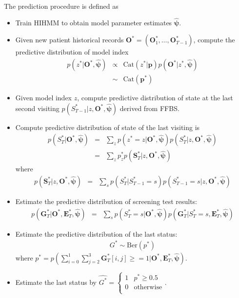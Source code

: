 \documentclass{article}
\begin{document}
The prediction procedure is defined as 
\begin{itemize}
	\item Train HIHMM to obtain model parameter estimates $\hat{\bm \psi}$.
	\item Given new patient historical records $\bm O^* = (\bm O^*_1, \ldots, \bm O^*_{T-1})$, compute the predictive distribution of model index
	\begin{eqnarray}
	p(z^*|\bm O^*, \hat{\bm \psi}) & \propto & \mathrm{Cat}(z^*|\bm p)p(\bm O^*|z^*, \hat{\bm \psi}) \nonumber \\
	& \sim & \mathrm{Cat}(\bm p^*)
	\end{eqnarray}
	\item Given model index $z$, compute predictive distribution of state at the last second visiting 
	$p(S^*_{T-1}|z, \bm O^*, \hat{\bm \psi})$ derived from FFBS.
	\item Compute predictive distribution of state of the last visiting is
	\begin{eqnarray}
	p(S^*_{T}|\bm O^*, \hat{\bm \psi}) & = & \sum_{z} p(z^* = z|\bm O^*, \hat{\bm \psi}) p(S^*_{T}|z, \bm O^*, \hat{\bm \psi}) \nonumber\\
	& = & \sum_{z} p^*_zp(\bm S^*_{T}|z, \bm O^*, \hat{\bm \psi})
	\end{eqnarray}
	where 
	\begin{eqnarray}
	p(\bm S^*_{T}|z, \bm O^*, \hat{\bm \psi}) & = & \sum_s p(S^*_{T}|S^*_{T-1} = s)p(S_{T-1}^* = s|z, \bm O^*,\hat{\bm \psi})
	\end{eqnarray}
	\item Estimate the predictive distribution of screening test results:
	\begin{eqnarray}
	p(\bm G^*_{T}| \bm O^*, \bm E^*_T, \hat{\bm \psi}) & = & \sum_s p(S^*_{T} = s|\bm O^*, \hat{\bm \psi}) p(\bm G^*_{T}| S_{T}^* = s, \bm E_{T}^*, \hat{\bm \psi}) \nonumber
	\end{eqnarray}
	\item Estimate the predictive distribution of the last status: 
	\begin{eqnarray}
	G^* \sim \mathrm{Ber}\left( p^* \right)
	\end{eqnarray}
	where $p^* = p\left(\sum_{i = 0}^{1}\sum_{j = 2}^3 \bm G_{T}^*[i,j] \geq = 1 |  \bm O^*, \bm E^*_T, \hat{\bm \psi}\right)$.
	\item Estimate the last status by $\hat{G^*} = \begin{cases}
	1 & p^* \geq 0.5 \\
	0 & \mathrm{otherwise} \\
	\end{cases}$.
\end{itemize}
\end{document}
